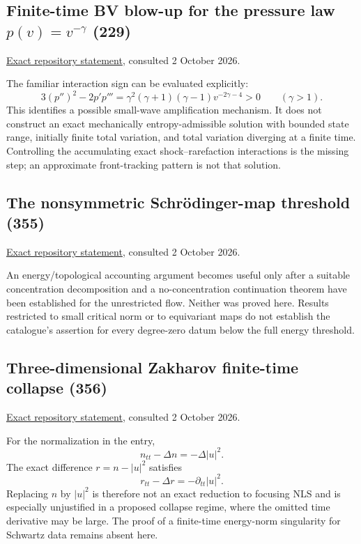 \documentclass[11pt,a4paper]{article}
\numberwithin{equation}{section}
\theoremstyle{remark}\newtheorem{remark}[theorem]{Remark}
\begin{document}
\subsection{Finite-time BV blow-up for the pressure law $p(v)=v^{-\gamma}$ (229)}
\href{https://raw.githubusercontent.com/MColbrook/AIM/main/problems/229-p-system-finite-time-bv.md}{Exact repository statement}, consulted 2 October 2026.\par
The familiar interaction sign can be evaluated explicitly:
\[
 3(p'')^2-2p'p'''=
 \gamma^2(\gamma+1)(\gamma-1)v^{-2\gamma-4}>0
 \qquad(\gamma>1).
\]
This identifies a possible small-wave amplification mechanism. It does not construct an exact mechanically entropy-admissible solution with bounded state range, initially finite total variation, and total variation diverging at a finite time. Controlling the accumulating exact shock--rarefaction interactions is the missing step; an approximate front-tracking pattern is not that solution.

\subsection{The nonsymmetric Schr\"odinger-map threshold (355)}
\href{https://raw.githubusercontent.com/MColbrook/AIM/main/problems/355-schrodinger-map-threshold.md}{Exact repository statement}, consulted 2 October 2026.\par
An energy/topological accounting argument becomes useful only after a suitable concentration decomposition and a no-concentration continuation theorem have been established for the unrestricted flow. Neither was proved here. Results restricted to small critical norm or to equivariant maps do not establish the catalogue's assertion for every degree-zero datum below the full energy threshold.

\subsection{Three-dimensional Zakharov finite-time collapse (356)}
\href{https://raw.githubusercontent.com/MColbrook/AIM/main/problems/356-zakharov-three-dimensional-collapse.md}{Exact repository statement}, consulted 2 October 2026.\par
For the normalization in the entry,
\[
 n_{tt}-\Delta n=-\Delta|u|^2.
\]
The exact difference $r=n-|u|^2$ satisfies
\[
 r_{tt}-\Delta r=-\partial_{tt}|u|^2.
\]
Replacing $n$ by $|u|^2$ is therefore not an exact reduction to focusing NLS and is especially unjustified in a proposed collapse regime, where the omitted time derivative may be large. The proof of a finite-time energy-norm singularity for Schwartz data remains absent here.
\end{document}
